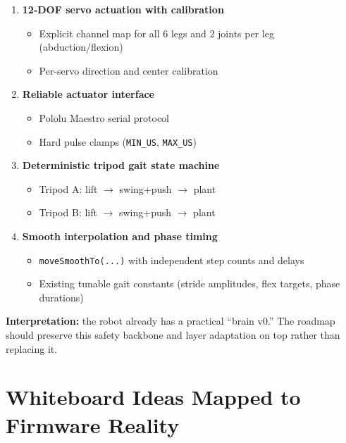 \documentclass[11pt]{article}
\begin{document}
\begin{enumerate}
    \item \textbf{12-DOF servo actuation with calibration}
    \begin{itemize}
        \item Explicit channel map for all 6 legs and 2 joints per leg (abduction/flexion)
        \item Per-servo direction and center calibration
    \end{itemize}
    \item \textbf{Reliable actuator interface}
    \begin{itemize}
        \item Pololu Maestro serial protocol
        \item Hard pulse clamps (\texttt{MIN\_US}, \texttt{MAX\_US})
    \end{itemize}
    \item \textbf{Deterministic tripod gait state machine}
    \begin{itemize}
        \item Tripod A: lift $\rightarrow$ swing+push $\rightarrow$ plant
        \item Tripod B: lift $\rightarrow$ swing+push $\rightarrow$ plant
    \end{itemize}
    \item \textbf{Smooth interpolation and phase timing}
    \begin{itemize}
        \item \texttt{moveSmoothTo(...)} with independent step counts and delays
        \item Existing tunable gait constants (stride amplitudes, flex targets, phase durations)
    \end{itemize}
\end{enumerate}

\textbf{Interpretation:} the robot already has a practical ``brain v0.'' The roadmap should preserve this safety backbone and layer adaptation on top rather than replacing it.

\section{Whiteboard Ideas Mapped to Firmware Reality}
\end{document}
